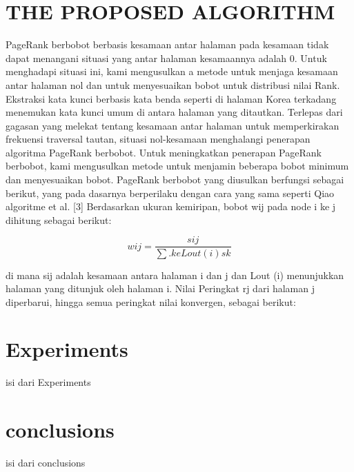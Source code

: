 \documentclass[conference]{IEEEtran}
\begin{document}
\section{THE PROPOSED ALGORITHM}
PageRank berbobot berbasis kesamaan antar halaman
pada kesamaan tidak dapat menangani situasi yang antar
halaman kesamaannya adalah 0. Untuk menghadapi situasi
ini, kami mengusulkan a metode untuk menjaga kesamaan
antar halaman nol dan untuk menyesuaikan bobot untuk
distribusi nilai Rank.
Ekstraksi kata kunci berbasis kata benda seperti di halaman
Korea terkadang menemukan kata kunci umum di antara
halaman yang ditautkan. Terlepas dari gagasan yang melekat
tentang kesamaan antar halaman untuk memperkirakan
frekuensi traversal tautan, situasi nol-kesamaan menghalangi
penerapan algoritma PageRank berbobot.
Untuk meningkatkan penerapan PageRank berbobot,
kami mengusulkan metode untuk menjamin beberapa bobot
minimum dan menyesuaikan bobot. PageRank berbobot yang
diusulkan berfungsi sebagai berikut, yang pada dasarnya
berperilaku dengan cara yang sama seperti Qiao algoritme et
al. [3]
Berdasarkan ukuran kemiripan, bobot wij pada node i ke j
dihitung sebagai berikut:

\begin{equation}
    wij = \frac{sij}{\sum. ke Lout(i) sk  } 
\end{equation}

di mana sij adalah kesamaan antara halaman i dan j dan
Lout (i) menunjukkan halaman yang ditunjuk oleh halaman i.
Nilai Peringkat rj dari halaman j diperbarui, hingga semua
peringkat nilai konvergen, sebagai berikut:


\section{Experiments}
isi dari Experiments

\section{conclusions}
isi dari conclusions



\end{document}
